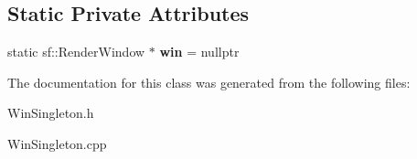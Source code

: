 \subsection*{Static Private Attributes}
\begin{DoxyCompactItemize}
\item 
\mbox{\label{class_win_singleton_ad2469dc3ef435d5739cda832be2b556f}} 
static sf\+::\+Render\+Window $\ast$ {\bfseries win} = nullptr
\end{DoxyCompactItemize}


The documentation for this class was generated from the following files\+:\begin{DoxyCompactItemize}
\item 
Win\+Singleton.\+h\item 
Win\+Singleton.\+cpp\end{DoxyCompactItemize}

